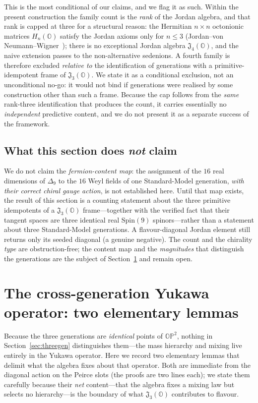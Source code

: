 \documentclass[11pt,a4paper]{article}
\theoremstyle{plain}
\newcommand{\JO}{\mathfrak{J}_3(\mathbb{O})}
\newcommand{\OP}{\mathbb{OP}^2}
\newcommand{\Spin}{\mathrm{Spin}}
\begin{document}
This is the most conditional of our claims, and we flag it as such. Within the
present construction the family count is the \emph{rank} of the Jordan algebra,
and that rank is capped at three for a structural reason: the Hermitian
$n \times n$ octonionic matrices $H_n(\mathbb{O})$ satisfy the Jordan axioms only
for $n \le 3$ (Jordan--von Neumann--Wigner~\cite{jvnw1934}); there is no
exceptional Jordan algebra $\mathfrak{J}_4(\mathbb{O})$, and the naive extension
passes to the non-alternative sedenions. A fourth family is therefore excluded
\emph{relative to} the identification of generations with a primitive-idempotent
frame of $\mathfrak{J}_3(\mathbb{O})$. We state it as a conditional
exclusion, not an unconditional no-go: it would not bind if generations were
realised by some construction other than such a frame. Because the cap follows
from the \emph{same} rank-three identification that produces the count, it carries
essentially no \emph{independent} predictive content, and we do not present it as a
separate success of the framework.

\subsection{What this section does \emph{not} claim}

We do not claim the \emph{fermion-content map}: the assignment of the $16$ real
dimensions of $\Delta_9$ to the $16$ Weyl fields of one Standard-Model generation,
\emph{with their correct chiral gauge action}, is not established here. Until that
map exists, the result of this section is a counting statement about the three
primitive idempotents of a $\JO$ frame---together with the verified fact that their
tangent spaces are three identical real $\Spin(9)$ spinors---rather than a
statement about three Standard-Model generations. A flavour-diagonal Jordan
element still returns only its seeded diagonal (a genuine negative). The count and
the chirality \emph{type} are obstruction-free; the content map and the
\emph{magnitudes} that distinguish the generations are the subject of
Section~\ref{sec:yukawa} and remain open.

\section{The cross-generation Yukawa operator: two elementary lemmas}
\label{sec:yukawa}

Because the three generations are \emph{identical} points of $\OP$, nothing in
Section~\ref{sec:threegen} distinguishes them---the mass hierarchy and mixing live
entirely in the Yukawa operator. Here we record two elementary lemmas that delimit
what the algebra fixes about that operator. Both are immediate from the diagonal
action on the Peirce slots (the proofs are two lines each); we state them
carefully because their \emph{net} content---that the algebra fixes a mixing law
but selects no hierarchy---is the boundary of what $\JO$ contributes to
flavour.
\end{document}
